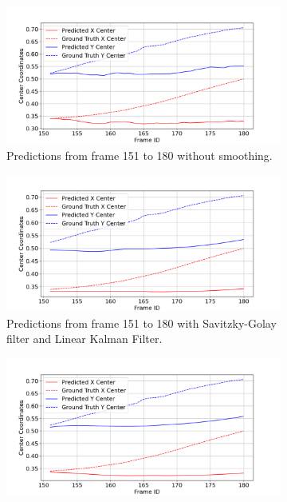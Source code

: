 \documentclass[12pt,oneside]{book} %
\begin{document}
\begin{figure}[H]
    \centering
    \begin{subfigure}[t]{0.9\textwidth}
        \includegraphics[width=\textwidth]{figures/framework/video_lab_platform_6 Raw Data - 3.png}
        \caption{Predictions from frame 151 to 180 without smoothing.}
        \label{fig:framework-video_lab_platform_6-3-raw}
    \end{subfigure}
    \hfill
    \begin{subfigure}[t]{0.9\textwidth}
        \includegraphics[width=\textwidth]{figures/framework/video_lab_platform_6 LKF SA Filter - 3.png}
        \caption{Predictions from frame 151 to 180 with Savitzky-Golay filter and Linear Kalman Filter.}
        \label{fig:framework-video_lab_platform_6-3-sa-lkf}
    \end{subfigure}
    \vfill
    \begin{subfigure}[t]{0.9\textwidth}
        \includegraphics[width=\textwidth]{figures/framework/video_lab_platform_6 SA Filter - 3.png}

\end{subfigure}
\end{figure}
\end{document}
